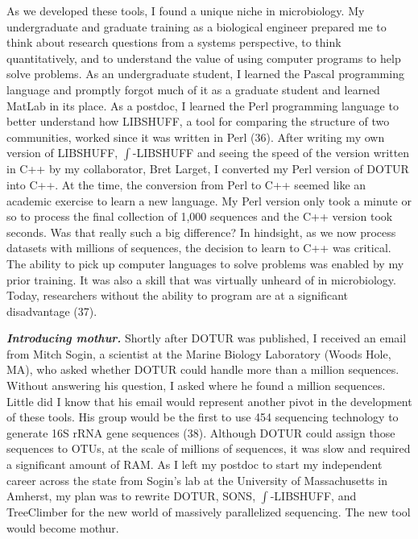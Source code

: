 \documentclass[11pt,]{article}
\begin{document}
As we developed these tools, I found a unique niche in microbiology. My
undergraduate and graduate training as a biological engineer prepared me
to think about research questions from a systems perspective, to think
quantitatively, and to understand the value of using computer programs
to help solve problems. As an undergraduate student, I learned the
Pascal programming language and promptly forgot much of it as a graduate
student and learned MatLab in its place. As a postdoc, I learned the
Perl programming language to better understand how LIBSHUFF, a tool for
comparing the structure of two communities, worked since it was written
in Perl (36). After writing my own version of LIBSHUFF,
\(\int\)-LIBSHUFF and seeing the speed of the version written in C++ by
my collaborator, Bret Larget, I converted my Perl version of DOTUR into
C++. At the time, the conversion from Perl to C++ seemed like an
academic exercise to learn a new language. My Perl version only took a
minute or so to process the final collection of 1,000 sequences and the
C++ version took seconds. Was that really such a big difference? In
hindsight, as we now process datasets with millions of sequences, the
decision to learn to C++ was critical. The ability to pick up computer
languages to solve problems was enabled by my prior training. It was
also a skill that was virtually unheard of in microbiology. Today,
researchers without the ability to program are at a significant
disadvantage (37).

\textbf{\emph{Introducing mothur.}} Shortly after DOTUR was published, I
received an email from Mitch Sogin, a scientist at the Marine Biology
Laboratory (Woods Hole, MA), who asked whether DOTUR could handle more
than a million sequences. Without answering his question, I asked where
he found a million sequences. Little did I know that his email would
represent another pivot in the development of these tools. His group
would be the first to use 454 sequencing technology to generate 16S rRNA
gene sequences (38). Although DOTUR could assign those sequences to
OTUs, at the scale of millions of sequences, it was slow and required a
significant amount of RAM. As I left my postdoc to start my independent
career across the state from Sogin's lab at the University of
Massachusetts in Amherst, my plan was to rewrite DOTUR, SONS,
\(\int\)-LIBSHUFF, and TreeClimber for the new world of massively
parallelized sequencing. The new tool would become mothur.
\end{document}
